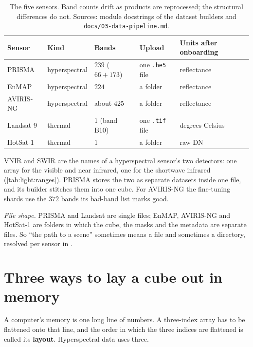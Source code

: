 \begin{table}[htbp]\centering
\caption{The five sensors. Band counts drift as products are reprocessed; the structural
differences do not. Sources: module docstrings of the dataset builders and
\texttt{docs/03-data-pipeline.md}.}\label{tab:sensors:roster}
\small
\begin{tabular}{@{}lllll@{}}\toprule
Sensor & Kind & Bands & Upload & Units after onboarding\\\midrule
PRISMA & hyperspectral & $239$ ($66 + 173$) & one \texttt{.he5} file & reflectance\\
EnMAP & hyperspectral & $224$ & a folder & reflectance\\
AVIRIS-NG & hyperspectral & about $425$ & a folder & reflectance\\
Landsat 9 & thermal & $1$ (band B10) & one \texttt{.tif} file & degrees Celsius\\
HotSat-1 & thermal & $1$ & a folder & raw DN\\\bottomrule
\end{tabular}
\end{table}

VNIR and SWIR are the names of a hyperspectral sensor's two detectors: one array for the visible
and near infrared, one for the shortwave infrared (\cref{tab:light:ranges}). PRISMA stores the
two as separate datasets inside one file, and its builder stitches them into one cube. For
AVIRIS-NG the fine-tuning shards use the $372$ bands its bad-band list marks good.

\emph{File shape.} PRISMA and Landsat are single files; EnMAP, AVIRIS-NG and HotSat-1 are folders
in which the cube, the masks and the metadata are separate files. So ``the path to a scene''
sometimes means a file and sometimes a directory, resolved per sensor in
.

\section{Three ways to lay a cube out in memory}\label{sec:sensors:layouts}

A computer's memory is one long line of numbers. A three-index array has to be flattened onto
that line, and the order in which the three indices are flattened is called its
\textbf{layout}. Hyperspectral data uses three.

